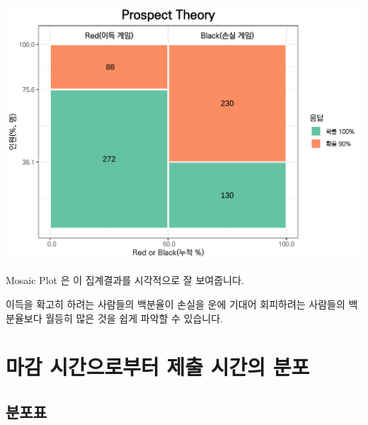 \documentclass[
]{book}
\begin{document}
\includegraphics{Quiz_report_2025_files/figure-latex/unnamed-chunk-303-1.pdf}

Mosaic Plot 은 이 집계결과를 시각적으로 잘 보여줍니다.

이득을 확고히 하려는 사람들의 백분율이 손실을 운에 기대어 회피하려는 사람들의 백분율보다 월등히 많은 것을 쉽게 파악할 수 있습니다.

\section{마감 시간으로부터 제출 시간의 분포}\label{uxb9c8uxac10-uxc2dcuxac04uxc73cuxb85cuxbd80uxd130-uxc81cuxcd9c-uxc2dcuxac04uxc758-uxbd84uxd3ec-10}

\subsection{분포표}\label{uxbd84uxd3ecuxd45c-11}
\end{document}
